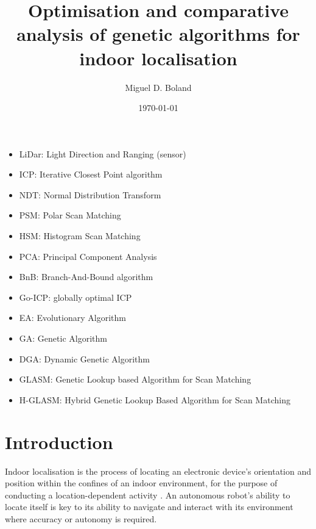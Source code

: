 \documentclass[authoryearcitations]{UoYCSproject}
\author{Miguel D. Boland}
\title{Optimisation and comparative analysis of genetic algorithms for indoor localisation}
\date{\today}
\begin{document}
\maketitle
\listoffigures
\listoftables
\lstlistoflistings
\begin{itemize}
	\item LiDar: Light Direction and Ranging (sensor)
	\item ICP: Iterative Closest Point algorithm \cite{Besl1992-pd}
	\item NDT: Normal Distribution Transform
	\item PSM: Polar Scan Matching
	\item HSM: Histogram Scan Matching
	\item PCA: Principal Component Analysis
	\item BnB: Branch-And-Bound algorithm \cite{Land1960-yw}
	\item Go-ICP: globally optimal ICP \cite{Yang2013-gx}
	\item EA: Evolutionary Algorithm
	\item GA: Genetic Algorithm
	\item DGA: Dynamic Genetic Algorithm \cite{Chow2004-xc}
	\item GLASM: Genetic Lookup based Algorithm for Scan Matching \cite{Lenac2007-xm}
	\item H-GLASM: Hybrid Genetic Lookup Based Algorithm for Scan Matching \cite{Lenac2011-co}

\end{itemize}



\chapter{Introduction}
\label{cha:Introduction}
Indoor localisation is the process of locating an electronic device's orientation and position within the confines of an indoor environment, for the purpose of conducting a location-dependent activity \cite{Curran2011-zs}. An autonomous robot's ability to locate itself is key to its ability to navigate and interact with its environment where accuracy or autonomy is required.
\newline
\end{document}
